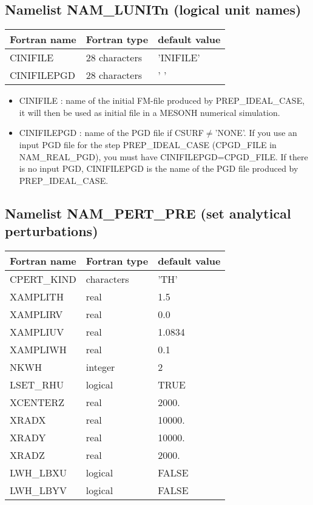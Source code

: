 \subsection{Namelist NAM\_LUNITn (logical unit names) }

\begin{center}
\begin{tabular} {|l|l|l|}
\hline
Fortran name & Fortran type & default value \\
\hline
CINIFILE     & 28 characters & 'INIFILE'\\
CINIFILEPGD  & 28 characters & ' '\\
\hline
\end{tabular}
\end{center}

\begin{itemize}
\item CINIFILE  : name of the initial FM-file  produced by PREP\_IDEAL\_CASE, it will then 
be used as initial file in a MESONH numerical simulation.
\item CINIFILEPGD  : name of the PGD file if CSURF$\neq$'NONE'. If you use an input PGD file for the step PREP\_IDEAL\_CASE (CPGD\_FILE in NAM\_REAL\_PGD), you must have CINIFILEPGD=CPGD\_FILE. If there is no input PGD, CINIFILEPGD is the name of the PGD file produced by PREP\_IDEAL\_CASE.
\end{itemize} 

\subsection{Namelist NAM\_PERT\_PRE (set analytical perturbations) }

\begin{center}
\begin{tabular} {|l|l|l|}
\hline
Fortran name & Fortran type & default value \\
\hline
CPERT\_KIND         & characters & 'TH'  \\
XAMPLITH            & real       & 1.5   \\
XAMPLIRV            & real       & 0.0   \\
XAMPLIUV            & real       & 1.0834   \\
XAMPLIWH            & real       & 0.1   \\
NKWH                & integer    & 2    \\
LSET\_RHU           & logical    & TRUE \\
XCENTERZ            & real       & 2000. \\
XRADX               & real       & 10000. \\
XRADY               & real       & 10000. \\
XRADZ               & real       & 2000. \\
LWH\_LBXU           & logical    & FALSE \\
LWH\_LBYV           & logical    & FALSE \\
\hline
\end{tabular}
\end{center}

